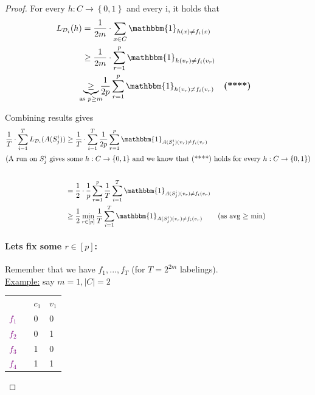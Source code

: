 \documentclass[10pt,a4paper]{article}
\theoremstyle{remark}
\theoremstyle{definition}
\theoremstyle{plain}
\begin{document}
\begin{proof}
	For every $h: C \to \left\{0,1\right\}$ and every i, it holds that 
	\begin{align*}
		L_{\mathcal{D}_i}(h) &= \frac{1}{2m} \cdot \sum_{x \in C} \mathbbm{1}_{h(x) \neq f_i(x)}\\
		&\geq \frac{1}{2m} \cdot \sum_{r = 1}^{p} \mathbbm{1}_{h(v_r) \neq f_i(v_r)}\\
		&\underbrace{\geq}_{\mathclap{\text{as } p \geq m}} \frac{1}{2p} \sum_{r = 1}^{p}  \mathbbm{1}_{h(v_r) \neq f_i(v_r)} && \text{\textbf{(****)}}
	\end{align*}
	
	Combining results gives 
\begin{align*}
		\frac{1}{T} \cdot \sum_{i = 1}^{T} L_{\mathcal{D}_i}(A(S_j^i)) &\geq \frac{1}{T} \cdot \sum_{i = 1}^{T} \frac{1}{2p} \sum_{r = 1}^{p} \mathbbm{1}_{A(S_j^i)(v_r) \neq f_i(v_r)}\\
		\intertext{(A run on $S_j^i$ gives some $h: C \to \left\{0,1\right\}$ and we know that (****) holds for every $h: C \to \{ 0,1 \}$)}\\
		&= \frac{1}{2} \cdot \frac{1}{p} \sum_{r = 1}^{p}\frac{1}{T} \sum_{i = 1}^{T} \mathbbm{1}_{A(S_j^i)(v_r) \neq f_i(v_r)}\\
		&\geq \frac{1}{2} \min_{r \in [p]} \frac{1}{T} \sum_{i = 1}^{T} \mathbbm{1}_{A(S_j^i)(v_r) \neq f_i(v_r)} 
			&& \text{(as avg $\geq$ min)}
\end{align*}
\paragraph{Lets fix some $r \in [p]$:} Remember that we have $f_1, ..., f_T$ (for $T = 2^{2m}$ labelings).\\
\underline{Example:} say $m = 1, |C| = 2$
\begin{table}[H]
	\begin{tabular}{lll|l}
		&  & $c_1$ & $v_1$ \\ \cline{3-4} 
		\textcolor{purple}{$f_1$} &  & 0     & 0     \\
		\textcolor{purple}{$f_2$} &  & 0     & 1     \\
		\textcolor{purple}{$f_3$} &  & 1     & 0     \\
		\textcolor{purple}{$f_4$} &  & 1     & 1    
	\end{tabular}
\end{table}


\end{proof}
\end{document}

